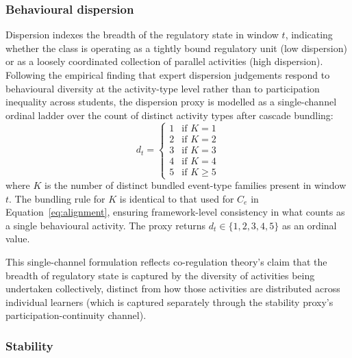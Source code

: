 \documentclass[preprint,12pt,authoryear]{elsarticle}
\begin{document}
\subsubsection{Behavioural dispersion}
\label{sec:proxy-dispersion}

Dispersion indexes the breadth of the regulatory state in window $t$, indicating whether the class is operating as a tightly bound regulatory unit (low dispersion) or as a loosely coordinated collection of parallel activities (high dispersion). Following the empirical finding that expert dispersion judgements respond to behavioural diversity at the activity-type level rather than to participation inequality across students, the dispersion proxy is modelled as a single-channel ordinal ladder over the count of distinct activity types after cascade bundling:
\begin{equation}
d_t = \begin{cases}
1 & \text{if } K = 1 \\
2 & \text{if } K = 2 \\
3 & \text{if } K = 3 \\
4 & \text{if } K = 4 \\
5 & \text{if } K \geq 5
\end{cases}
\label{eq:dispersion}
\end{equation}
where $K$ is the number of distinct bundled event-type families present in window $t$. The bundling rule for $K$ is identical to that used for $C_e$ in Equation~\ref{eq:alignment}, ensuring framework-level consistency in what counts as a single behavioural activity. The proxy returns $d_t \in \{1,2,3,4,5\}$ as an ordinal value.

This single-channel formulation reflects co-regulation theory's claim that the breadth of regulatory state is captured by the diversity of activities being undertaken collectively, distinct from how those activities are distributed across individual learners (which is captured separately through the stability proxy's participation-continuity channel).

\subsubsection{Stability}
\label{sec:proxy-stability}
\end{document}
